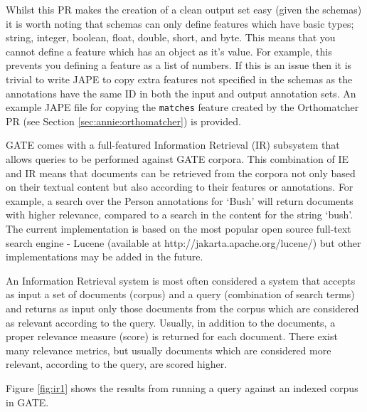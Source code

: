 Whilst this PR makes the creation of a clean output set easy (given the schemas) it is worth
noting that schemas can only define features which have basic types; string, integer, boolean,
float, double, short, and byte. This means that you cannot define a feature which has an object
as it's value. For example, this prevents you defining a feature as a list of numbers. If this is an
issue then it is trivial to write JAPE to copy extra features not specified in the schemas as the 
annotations have the same ID in both the input and output annotation sets. An example JAPE
file for copying the \texttt{matches} feature created by the Orthomatcher PR (see
Section \ref{sec:annie:orthomatcher}) is provided.


GATE comes with a full-featured Information Retrieval (IR) subsystem
that allows queries to be performed against GATE corpora. This
combination of IE and IR means that documents can be retrieved from
the corpora not only based on their textual content but also according
to their features or annotations. For example, a search over the Person
annotations for `Bush' will return documents with higher relevance,
compared to a search in the content for the string `bush'. The current
implementation is based on the most popular open source full-text
search engine - Lucene (available at
http://jakarta.apache.org/lucene/) but other implementations may be
added in the future.

An Information Retrieval system is most often considered a system that
accepts as input a set of documents (corpus) and a query (combination
of search terms) and returns as input only those documents from the
corpus which are considered as relevant according to the
query. Usually, in addition to the documents, a proper relevance
measure (score) is returned for each document. There exist many
relevance metrics, but usually documents which are considered more
relevant, according to the query, are scored higher.

Figure \ref{fig:ir1} shows the results from running a query against an
indexed corpus in GATE.

